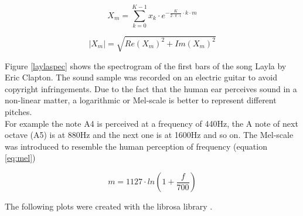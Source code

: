 \begin{equation} \label{eq:fft}
X_m = \sum_{k=0}^{K-1}{x_k \cdot e^ { - \frac{K}{ 2 \cdot \pi \cdot i}\cdot k\cdot m}}
\end{equation}

\begin{equation} \label{eq:absfft}
|X_m| = \sqrt{Re(X_m)^2 + Im(X_m)^2}
\end{equation}

Figure \ref{laylaspec} shows the spectrogram of the first bars of the song Layla by Eric Clapton. The sound sample was recorded on an electric guitar to avoid copyright infringements. 
Due to the fact that the human ear perceives sound in a non-linear matter, a logarithmic or Mel-scale is better to represent different pitches.\\ 
For example the note A4 is perceived at a frequency of 440Hz, the A note of next octave (A5) is at 880Hz and the next one is at 1600Hz and so on. 
The Mel-scale \cite[pp. 53f]{knees1} was introduced to resemble the human perception of frequency (equation \ref{eq:mel})

\begin{equation} \label{eq:mel}
m = 1127 \cdot ln(1 + \frac{f}{700})
\end{equation}

The following plots were created with the librosa library \cite{librosa1}.

